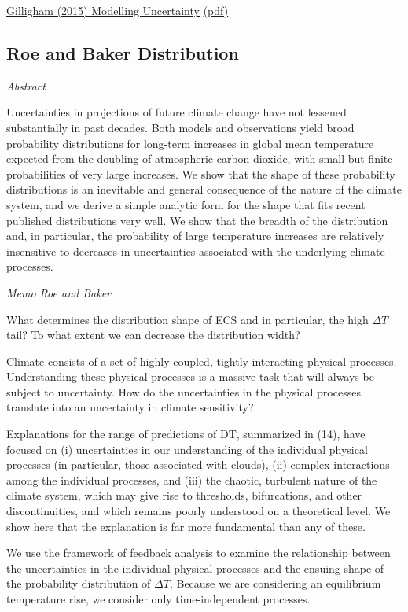 \documentclass[
]{book}
\begin{document}
\href{https://globalchange.mit.edu/publication/16235}{Gilligham (2015) Modelling Uncertainty}
\href{pdf/Gillingham_2015_Modelling_Uncertainty.pdf}{(pdf)}

\hypertarget{roe-and-baker-distribution}{%
\subsection{Roe and Baker Distribution}\label{roe-and-baker-distribution}}

\emph{Abstract}

Uncertainties in projections of future climate change have not lessened substantially in past
decades. Both models and observations yield broad probability distributions for long-term
increases in global mean temperature expected from the doubling of atmospheric carbon dioxide,
with small but finite probabilities of very large increases. We show that the shape of these
probability distributions is an inevitable and general consequence of the nature of the climate
system, and we derive a simple analytic form for the shape that fits recent published distributions
very well. We show that the breadth of the distribution and, in particular, the probability of
large temperature increases are relatively insensitive to decreases in uncertainties associated with
the underlying climate processes.

\emph{Memo Roe and Baker}

What determines the distribution shape of ECS and in particular, the high \(\Delta T\) tail?
To what extent we can decrease the distribution width?

Climate consists of a set of highly coupled, tightly interacting physical processes.
Understanding these physical processes is a massive
task that will always be subject to uncertainty.
How do the uncertainties in the physical processes translate into an uncertainty in climate
sensitivity?

Explanations for the range of
predictions of DT, summarized in (14), have
focused on
(i) uncertainties in our understanding of the individual physical processes
(in particular, those associated with clouds),
(ii) complex interactions among the individual processes, and
(iii) the chaotic, turbulent nature of the climate system, which may give rise to
thresholds, bifurcations, and other discontinuities, and which
remains poorly understood on a theoretical level.
We show here that the explanation is far more fundamental than any of these.

We use the framework of feedback analysis to examine the relationship between the
uncertainties in the individual physical processes and the ensuing shape of
the probability distribution of \(\Delta T\).
Because we are considering an equilibrium temperature rise, we consider only
time-independent processes.
\end{document}
